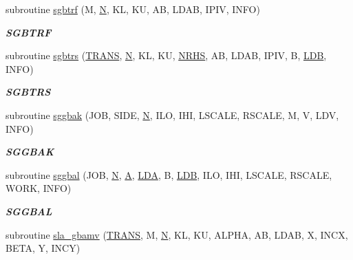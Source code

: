 \begin{DoxyCompactItemize}
subroutine \hyperlink{group__realGBcomputational_gacebccf97a748c611292ce5e6b05d2168}{sgbtrf} (M, \hyperlink{polmisc_8c_a0240ac851181b84ac374872dc5434ee4}{N}, K\+L, K\+U, A\+B, L\+D\+A\+B, I\+P\+I\+V, I\+N\+F\+O)
\begin{DoxyCompactList}\small\item\em {\bfseries S\+G\+B\+T\+R\+F} \end{DoxyCompactList}\item 
subroutine \hyperlink{group__realGBcomputational_ga1ca828b2948fbb78c91ed3e2961bcbd2}{sgbtrs} (\hyperlink{superlu__enum__consts_8h_a0c4e17b2d5cea33f9991ccc6a6678d62a1f61e3015bfe0f0c2c3fda4c5a0cdf58}{T\+R\+A\+N\+S}, \hyperlink{polmisc_8c_a0240ac851181b84ac374872dc5434ee4}{N}, K\+L, K\+U, \hyperlink{example__user_8c_aa0138da002ce2a90360df2f521eb3198}{N\+R\+H\+S}, A\+B, L\+D\+A\+B, I\+P\+I\+V, B, \hyperlink{example__user_8c_a50e90a7104df172b5a89a06c47fcca04}{L\+D\+B}, I\+N\+F\+O)
\begin{DoxyCompactList}\small\item\em {\bfseries S\+G\+B\+T\+R\+S} \end{DoxyCompactList}\item 
subroutine \hyperlink{group__realGBcomputational_ga2acdb08b4db950b2c7c27e5b233de143}{sggbak} (J\+O\+B, S\+I\+D\+E, \hyperlink{polmisc_8c_a0240ac851181b84ac374872dc5434ee4}{N}, I\+L\+O, I\+H\+I, L\+S\+C\+A\+L\+E, R\+S\+C\+A\+L\+E, M, V, L\+D\+V, I\+N\+F\+O)
\begin{DoxyCompactList}\small\item\em {\bfseries S\+G\+G\+B\+A\+K} \end{DoxyCompactList}\item 
subroutine \hyperlink{group__realGBcomputational_ga7507b854d792a8dce687e6e876a7ab3f}{sggbal} (J\+O\+B, \hyperlink{polmisc_8c_a0240ac851181b84ac374872dc5434ee4}{N}, \hyperlink{classA}{A}, \hyperlink{example__user_8c_ae946da542ce0db94dced19b2ecefd1aa}{L\+D\+A}, B, \hyperlink{example__user_8c_a50e90a7104df172b5a89a06c47fcca04}{L\+D\+B}, I\+L\+O, I\+H\+I, L\+S\+C\+A\+L\+E, R\+S\+C\+A\+L\+E, W\+O\+R\+K, I\+N\+F\+O)
\begin{DoxyCompactList}\small\item\em {\bfseries S\+G\+G\+B\+A\+L} \end{DoxyCompactList}\item 
subroutine \hyperlink{group__realGBcomputational_ga2ec4f3b65681172c1dd786df6580b176}{sla\+\_\+gbamv} (\hyperlink{superlu__enum__consts_8h_a0c4e17b2d5cea33f9991ccc6a6678d62a1f61e3015bfe0f0c2c3fda4c5a0cdf58}{T\+R\+A\+N\+S}, M, \hyperlink{polmisc_8c_a0240ac851181b84ac374872dc5434ee4}{N}, K\+L, K\+U, A\+L\+P\+H\+A, A\+B, L\+D\+A\+B, X, I\+N\+C\+X, B\+E\+T\+A, Y, I\+N\+C\+Y)

\end{DoxyCompactItemize}
